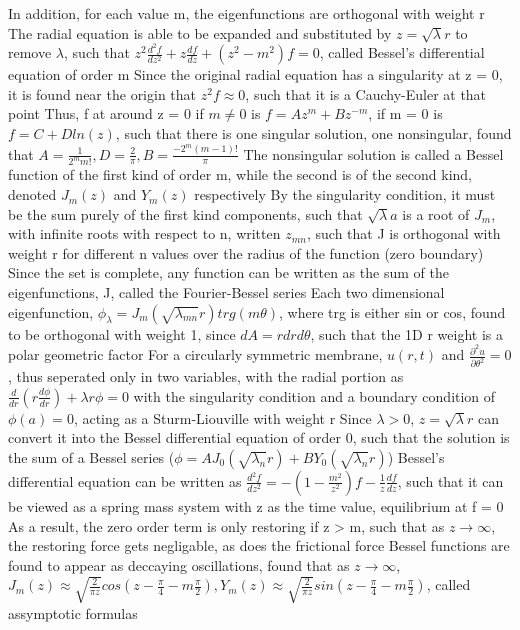 \documentclass[11 pt, twoside]{article}
\newenvironment{outline*}
{
	\begin{outline}[enumerate]
	}
	{\end{outline}
}
\newcommand\pd[2]{\frac{\partial #1}{\partial #2}}
\begin{document}
\begin{outline*}
			\4 In addition, for each value m, the eigenfunctions are orthogonal with weight r
	\2 The radial equation is able to be expanded and substituted by $z = \sqrt{\lambda}r$ to remove $\lambda$, such that $z^2\frac{d^2f}{dz^2} + z\frac{df}{dz} + (z^2 - m^2)f = 0$, called Bessel's differential equation of order m
		\3 Since the original radial equation has a singularity at z = 0, it is found near the origin that $z^2f \approx 0$, such that it is a Cauchy-Euler at that point
		\3 Thus, f at around z = 0 if $m \neq 0$ is $f = Az^m + Bz^{-m}$, if m = 0 is $f = C + Dln(z)$, such that there is one singular solution, one nonsingular, found that $A = \frac{1}{2^mm!}, D = \frac{2}{\pi}, B = \frac{-2^m(m - 1)!}{\pi}$
			\4 The nonsingular solution is called a Bessel function of the first kind of order m, while the second is of the second kind, denoted $J_m(z)$ and $Y_m(z)$ respectively
		\3 By the singularity condition, it must be the sum purely of the first kind components, such that $\sqrt{\lambda}a$ is a root of $J_m$, with infinite roots with respect to n, written $z_{mn}$, such that J is orthogonal with weight r for different n values over the radius of the function (zero boundary)
			\4 Since the set is complete, any function can be written as the sum of the eigenfunctions, J, called the Fourier-Bessel series
	\2 Each two dimensional eigenfunction, $\phi_{\lambda} = J_m(\sqrt{\lambda_{mn}}r)trg(m\theta)$, where trg is either sin or cos, found to be orthogonal with weight 1, since $dA = rdrd\theta$, such that the 1D r weight is a polar geometric factor
	\2 For a circularly symmetric membrane, $u(r, t)$ and $\pd{^2u}{\theta^2} = 0$, thus seperated only in two variables, with the radial portion as $\frac{d}{dr}(r\frac{d\phi}{dr}) + \lambda r \phi = 0$ with the singularity condition and a boundary condition of $\phi(a) = 0$, acting as a Sturm-Liouville with weight r
		\3 Since $\lambda > 0$, $z = \sqrt{\lambda}r$ can convert it into the Bessel differential equation of order 0, such that the solution is the sum of a Bessel series ($\phi = AJ_0(\sqrt{\lambda_n}r) + BY_0(\sqrt{\lambda_n}r)$)
\1 Bessel's differential equation can be written as $\frac{d^2f}{dz^2} = -(1 - \frac{m^2}{z^2})f - \frac{1}{z}\frac{df}{dz}$, such that it can be viewed as a spring mass system with z as the time value, equilibrium at f = 0
	\2 As a result, the zero order term is only restoring if z > m, such that as $z \to \infty$, the restoring force gets negligable, as does the frictional force
		\3 Bessel functions are found to appear as deccaying oscillations, found that as $z \to \infty$, $J_m(z) \approx \sqrt{\frac{2}{\pi z}}cos(z - \frac{\pi}{4} - m\frac{\pi}{2}), Y_m(z) \approx \sqrt{\frac{2}{\pi z}}sin(z - \frac{\pi}{4} - m\frac{\pi}{2})$, called assymptotic formulas

\end{outline*}
\end{document}
